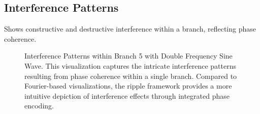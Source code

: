 \documentclass[12pt]{article}
\begin{document}
\subsection{Interference Patterns}
Shows constructive and destructive interference within a branch, reflecting phase coherence.

\begin{figure}[h!]
    \centering
    \caption{Interference Patterns within Branch 5 with Double Frequency Sine Wave. This visualization captures the intricate interference patterns resulting from phase coherence within a single branch. Compared to Fourier-based visualizations, the ripple framework provides a more intuitive depiction of interference effects through integrated phase encoding.}
    \label{fig:interference_patterns}
\end{figure}


\end{document}
